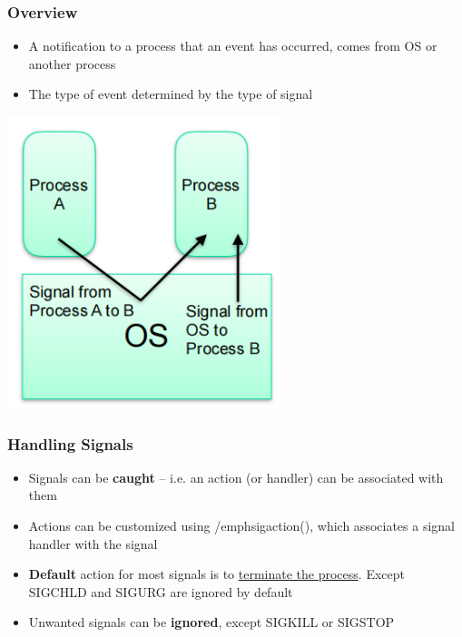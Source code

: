 \documentclass[12pt]{article}
\begin{document}
\subsubsection{Overview}
\begin{itemize}
    \item A notification to a process that an event has occurred, comes from OS or another process
    \item The type of event determined by the type of signal
\end{itemize}
\includegraphics[width=0.6\textwidth]{SignalOverview.png}
\subsubsection{Handling Signals}
\begin{itemize}
    \item Signals can be {\bfseries caught} – i.e. an action (or handler) can be associated with them
    \item Actions can be customized using /emph{sigaction()}, which associates a signal handler with the signal
    \item {\bfseries Default} action for most signals is to \underline{terminate the process}. Except SIGCHLD and SIGURG are ignored by default
    \item Unwanted signals can be {\bfseries ignored}, except SIGKILL or SIGSTOP
\end{itemize}
\end{document}
